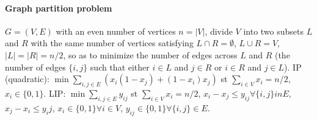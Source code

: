 \documentclass[main]{subfiles}
\begin{document}
\paragraph{Graph partition problem}
$G=(V,E)$ with an even number of vertices $n=|V|$, divide $V$ into two subsets
$L$ and $R$ with the same number of vertices satisfying $L\cap R=\emptyset$,
$L\cup R=V$, $|L|=|R|=n/2$, so as to minimize the number of edges across $L$
and $R$ (the number of edges $\{i,j\}$ such that either $i\in L$ and $j\in R$
or $i\in R$ and $j \in L$). IP (quadratic): $\min \sum_{i,j \in E} (x_i(1-x_j)
+(1-x_i)x_j)$ st $\sum_{i \in V} x_i = n/2$, $x_i \in \{0,1\}$. LIP: $\min
\sum_{i,j \in E} y_{ij}$ st $\sum_{i\in V} x_i = n/2$, $x_i - x_j \leq y_{ij}
\forall \{i,j\} in E$, $x_j - x_i \leq y_ij$, $x_i \in \{0,1\} \forall i \in
V$, $y_{ij} \in \{0,1\} \forall \{i,j\} \in E$.
\end{document}
